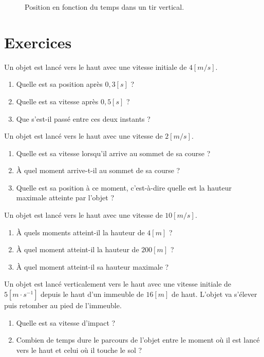 \begin{figure}[h!]
  \centering
  
  \caption{Position en fonction du temps dans un tir vertical.}
  \label{position_tir_vertical}
\end{figure}

\newpage

\section{Exercices}
\begin{exercise}
  Un objet est lancé vers le haut avec une vitesse initiale de \(4\unit{[m/s]}\).
  \begin{enumerate}[label=\alph*)]
    \item Quelle est sa position après \(0,3\unit{[s]}\) ?
    \item Quelle est sa vitesse après \(0,5\unit{[s]}\) ?
    \item Que s'est-il passé entre ces deux instants ?
  \end{enumerate}
\end{exercise}

\begin{exercise}
  Un objet est lancé vers le haut avec une vitesse de \(2\unit{[m/s]}\).
  \begin{enumerate}[label=\alph*)]
    \item Quelle est sa vitesse lorsqu'il arrive au sommet de sa course ?
    \item À quel moment arrive-t-il au sommet de sa course ?
    \item Quelle est sa position à ce moment, c'est-à-dire quelle est la hauteur maximale atteinte par l'objet ?
  \end{enumerate}
\end{exercise}

\begin{exercise}
  Un objet est lancé vers le haut avec une vitesse de \(10 \unit{[m/s]}\).
  \begin{enumerate}[label=\alph*)]
    \item À quels moments atteint-il la hauteur de \(4\unit{[m]}\) ?
    \item À quel moment atteint-il la hauteur de \(200\unit{[m]}\) ?
    \item À quel moment atteint-il sa hauteur maximale ?
  \end{enumerate}
\end{exercise}

\begin{exercise}
  Un objet est lancé verticalement vers le haut avec une vitesse initiale de \(5[m \cdot s^{-1}]\) depuis le haut d'un immeuble de \(16\unit{[m]}\) de haut. L'objet va s'élever puis retomber au pied de l'immeuble.
  \begin{enumerate}[label=\alph*)]
    \item        Quelle est sa vitesse d'impact ?
    \item       Combien de temps dure le parcours de l'objet entre le moment où il est lancé vers le haut et celui où il touche le sol ?
  \end{enumerate}
\end{exercise}

